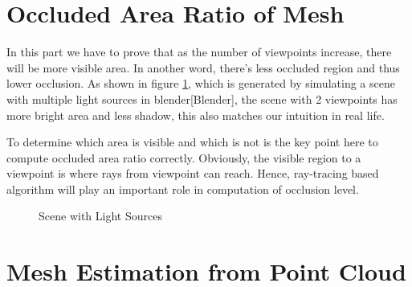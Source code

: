 \documentclass[11pt, a4paper,oneside,chapterprefix=false]{scrbook}
\begin{document}
\section{Occluded Area Ratio of Mesh} \label{sec:occluded area ratio of mesh}

In this part we have to prove that as the number of viewpoints increase, there will be more visible area. In another word, there's less occluded region and thus lower occlusion. As shown in figure \ref{fig:scene with light sources}, which is generated by simulating a scene with multiple light sources in blender[Blender], the scene with 2 viewpoints has more bright area and less shadow, this also matches our intuition in real life. 

\vspace{10pt}

To determine which area is visible and which is not is the key point here to compute occluded area ratio correctly. Obviously, the visible region to a viewpoint is where rays from viewpoint can reach. Hence, ray-tracing based algorithm will play an important role in computation of occlusion level.  

\begin{figure}[H]
    \centering
     \hfill
    \caption{Scene with Light Sources}
    \label{fig:scene with light sources}
\end{figure}

\section{Mesh Estimation from Point Cloud} \label{mesh estimation of point cloud}
\end{document}

